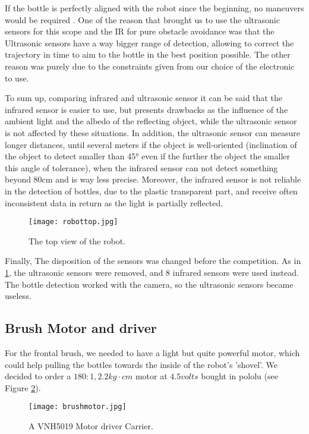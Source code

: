 If the bottle is perfectly aligned with the robot since the beginning, no maneuvers would be required .
One of the reason that brought us to use the ultrasonic sensors for this scope and the IR for pure obstacle avoidance was that the Ultrasonic sensors have a way bigger range of detection, allowing to correct the trajectory in time to aim to the bottle in the best position possible.
The other reason was purely due to the constraints given from our choice of the electronic to use.

To sum up, comparing infrared and ultrasonic sensor it can be said that the infrared sensor is easier to use, but presents drawbacks as the influence of the ambient light and the albedo of the reflecting object, while the ultrasonic sensor is not affected by these situations. In addition, the ultrasonic sensor can measure longer distances, until
several meters if the object is well-oriented (inclination of the object to detect smaller than 45° even if the further the object the smaller this angle of tolerance), when the infrared sensor can not detect something beyond 80cm and is way less precise.
Moreover, the infrared sensor is not reliable in the detection of bottles, due to the plastic transparent part, and receive often inconsistent data in return as the light is partially reflected.

\begin{figure}[H]
  \centering
  \texttt{[image: robottop.jpg]}
  \caption{The top view of the robot.}
\label{fig:robottop}
\end{figure}

Finally, The disposition of the sensors was changed before the competition. As in \ref{fig:robottop}, the ultrasonic sensors were removed, and 8 infrared sensors were used instead. The bottle detection worked with the camera, so the ultrasonic sensors became useless.

\subsection{Brush Motor and driver}

For the frontal brush, we needed to have a light but quite powerful motor, which could help pulling the bottles towards the inside of the robot's 'shovel'. We decided to order a $180:1, 2.2 kg\cdot cm$ motor at $4.5 volts$ bought in pololu (see Figure \ref{fig:brushmotor}).

\begin{figure}[H]
  \centering
  \texttt{[image: brushmotor.jpg]}
  \caption{A VNH5019 Motor driver Carrier.}
\label{fig:brushmotor}
\end{figure}

